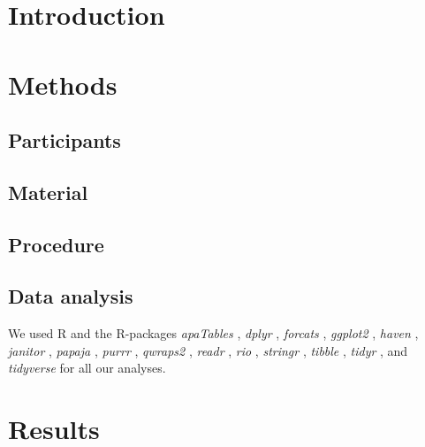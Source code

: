 \documentclass[
  english,
  man,floatsintext]{apa6}
\begin{document}
\hypertarget{introduction}{%
\section{Introduction}\label{introduction}}

\hypertarget{methods}{%
\section{Methods}\label{methods}}

\hypertarget{participants}{%
\subsection{Participants}\label{participants}}

\hypertarget{material}{%
\subsection{Material}\label{material}}

\hypertarget{procedure}{%
\subsection{Procedure}\label{procedure}}

\hypertarget{data-analysis}{%
\subsection{Data analysis}\label{data-analysis}}

We used R \autocite[Version 4.0.3;][]{R-base} and the R-packages \emph{apaTables} \autocite[Version 2.0.5;][]{R-apaTables}, \emph{dplyr} \autocite[Version 1.0.2;][]{R-dplyr}, \emph{forcats} \autocite[Version 0.5.0;][]{R-forcats}, \emph{ggplot2} \autocite[Version 3.3.2;][]{R-ggplot2}, \emph{haven} \autocite[Version 2.3.1;][]{R-haven}, \emph{janitor} \autocite[Version 2.0.1;][]{R-janitor}, \emph{papaja} \autocite[Version 0.1.0.9997;][]{R-papaja}, \emph{purrr} \autocite[Version 0.3.4;][]{R-purrr}, \emph{qwraps2} \autocite[Version 0.5.0;][]{R-qwraps2}, \emph{readr} \autocite[Version 1.3.1;][]{R-readr}, \emph{rio} \autocite[Version 0.5.16;][]{R-rio}, \emph{stringr} \autocite[Version 1.4.0;][]{R-stringr}, \emph{tibble} \autocite[Version 3.0.3;][]{R-tibble}, \emph{tidyr} \autocite[Version 1.1.2;][]{R-tidyr}, and \emph{tidyverse} \autocite[Version 1.3.0;][]{R-tidyverse} for all our analyses.

\hypertarget{results}{%
\section{Results}\label{results}}
\end{document}

